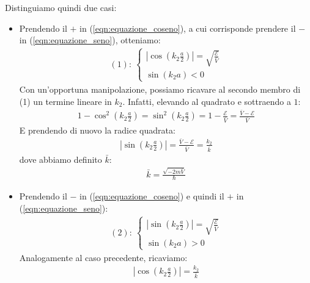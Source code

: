 \documentclass[../../FisicaTeorica.tex]{subfiles}
\begin{document}
Distinguiamo quindi due casi:
\begin{itemize}
\item Prendendo il $+$ in (\ref{eqn:equazione_coseno}), a cui corrisponde prendere il $-$ in (\ref{eqn:equazione_seno}), otteniamo:
\begin{align*}
(1):\>
\begin{cases}
\left|\cos\left(k_2 \frac{a}{2}\right)\right| = \sqrt{\frac{\mathcal{E}}{\bar{V}}}\\
\sin(k_2 a) < 0
\end{cases}
\end{align*} 
Con un'opportuna manipolazione, possiamo ricavare al secondo membro di (1) un termine lineare in $k_2$. Infatti, elevando al quadrato e sottraendo a $1$:
\begin{align*}
    1-\cos^2\left( k_2 \frac{a}{2} \right) = \sin^2\left(k_2 \frac{a}{2}\right) = 1 - \frac{\mathcal{E}}{\bar{V}} = \frac{\bar{V}-\mathcal{E}}{\bar{V}}
\end{align*}
E prendendo di nuovo la radice quadrata:
\begin{align*}
    \left| \sin\left(k_2 \frac{a}{2}\right) \right| = \frac{\bar{V}-\mathcal{E}}{\bar{V}} = \frac{k_2}{\bar{k}}
\end{align*}
dove abbiamo definito $\bar{k}$:
\begin{align*}
\bar{k} = \frac{\sqrt{-2m\bar{V}}}{\hbar}
\end{align*}
\item Prendendo il $-$ in (\ref{eqn:equazione_coseno}) e quindi il $+$ in (\ref{eqn:equazione_seno}):
\begin{align*}
(2):\>\begin{cases}
\left|\sin\left(k_2\frac{a}{2}\right)\right| = \sqrt{\frac{\mathcal{E}}{\bar{V}}}\\
\sin(k_2 a)>0
\end{cases}
\end{align*}
Analogamente al caso precedente, ricaviamo:
\begin{align}
    \left|\cos\left(k_2 \frac{a}{2}\right) \right| = \frac{k_2}{\bar{k}}
\end{align}
\end{itemize}
\end{document}
